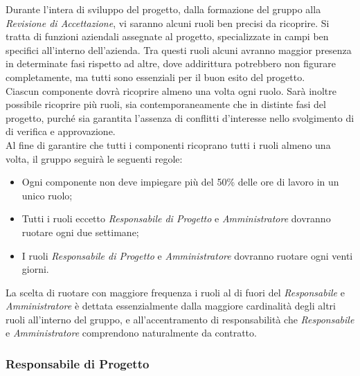 \documentclass{scalatekids-article}
\begin{document}
Durante l'intera  di sviluppo del progetto, dalla formazione del gruppo alla
\textit{Revisione di Accettazione}, vi saranno alcuni ruoli ben precisi da ricoprire. Si
tratta di funzioni aziendali assegnate al progetto, specializzate in campi ben
specifici all'interno dell'azienda. Tra questi ruoli alcuni avranno maggior
presenza in determinate fasi rispetto ad altre, dove addirittura
potrebbero non figurare completamente, ma tutti sono essenziali per il buon
esito del progetto.\\ Ciascun componente dovrà ricoprire almeno una volta ogni
ruolo. Sarà inoltre possibile ricoprire più ruoli, sia contemporaneamente che in
distinte fasi del progetto, purché sia garantita l'assenza di conflitti
d'interesse nello svolgimento di  di verifica e approvazione.\\
Al fine di garantire che tutti i componenti ricoprano tutti i ruoli almeno una volta, il gruppo seguirà le seguenti regole:
\begin{itemize}
\item Ogni componente non deve impiegare più del 50\% delle ore di lavoro in un unico ruolo;
\item Tutti i ruoli eccetto \textit{Responsabile di Progetto} e \textit{Amministratore} dovranno ruotare ogni due settimane;
\item I ruoli \textit{Responsabile di Progetto} e \textit{Amministratore} dovranno ruotare ogni venti giorni.
\end{itemize}
La scelta di ruotare con maggiore frequenza i ruoli al di fuori del
\textit{Responsabile} e \textit{Amministratore} è dettata essenzialmente dalla
maggiore cardinalità degli altri ruoli all'interno del gruppo, e
all'accentramento di responsabilità che \textit{Responsabile} e
\textit{Amministratore} comprendono naturalmente da contratto.

\subsubsection{Responsabile di Progetto}
\end{document}
